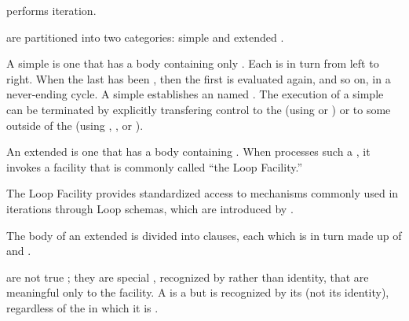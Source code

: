 
\def\LoopFacility{Loop Facility}
\def\LoopSchema{Loop schema}
\def\LoopSchemas{Loop schemas}


 performs iteration.

  are partitioned into two categories: 
     simple   
 and extended  .


A simple   is one that has a body containing
only .
Each  is  in turn from left to right.
When the last  has been , 
then the first  is evaluated again, and so on, in a never-ending cycle.
A simple   establishes an  named \nil.
The execution of a simple  can be terminated by explicitly
transfering control to the  (using  or
) or to some  outside of the  
(\eg using , , or ).


\endsubSection%

An extended   is one that has a body containing
 .  When  processes such a
, it invokes a facility that is commonly called ``the {\LoopFacility}.''

The {\LoopFacility} provides standardized access to mechanisms commonly used 
in iterations through {\LoopSchemas}, which are introduced by .

The body of an extended   is divided into  clauses,
each which is in turn made up of  and . 


 are not true ; 
they are special , recognized by  rather than  identity,
that are meaningful only to the  facility.
A  is a  but is recognized by its 
(not its identity), regardless of the  in which it is .  

